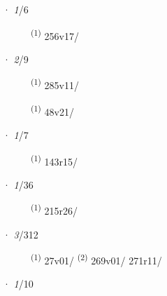 \ENTRYEND
\noindent{} · \textit{1}/6 \LEMMALINE
\begin{description}
    \item[]  \textsuperscript{(1)} \mbox{256v17/}
\end{description}
\ENTRYEND
\noindent{} · \textit{2}/9 \LEMMALINE
\begin{description}
    \item[]  \textsuperscript{(1)} \mbox{285v11/}
    \item[]  \textsuperscript{(1)} \mbox{48v21/}
\end{description}
\ENTRYEND
\noindent{} · \textit{1}/7 \LEMMALINE
\begin{description}
    \item[]  \textsuperscript{(1)} \mbox{143r15/}
\end{description}
\ENTRYEND
\noindent{} · \textit{1}/36 \LEMMALINE
\begin{description}
    \item[]  \textsuperscript{(1)} \mbox{215r26/}
\end{description}
\ENTRYEND
\noindent{} · \textit{3}/312 \LEMMALINE
\begin{description}
    \item[]  \textsuperscript{(1)} \mbox{27v01/} \textsuperscript{(2)} \mbox{269v01/} \mbox{271r11/}
\end{description}
\ENTRYEND
\noindent{} · \textit{1}/10 \LEMMALINE
